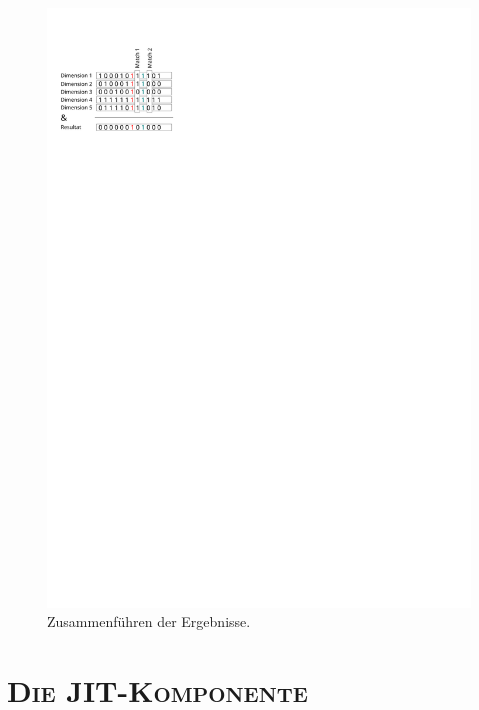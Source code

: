 \documentclass[xcolor=x11names,compress]{beamer}
\renewcommand{\(}{\begin{columns}}
\renewcommand{\)}{\end{columns}}
\newcommand{\<}[1]{\begin{column}{#1}}
\renewcommand{\>}{\end{column}}
\begin{document}
\begin{frame}
  \begin{figure}
  \centering
  \includegraphics[height=0.7\textheight]{figures/matching}
  \caption{Zusammenführen der Ergebnisse.}
  \end{figure}
\end{frame}

\section{\scshape Die JIT-Komponente}
\end{document}
